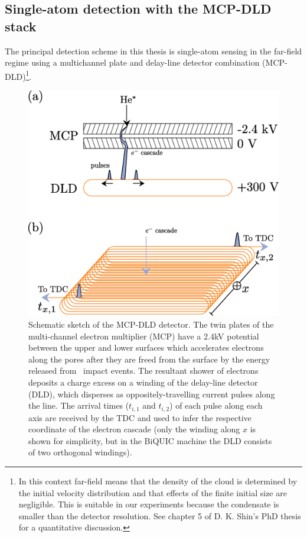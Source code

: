 \subsection*{Single-atom detection with the MCP-DLD stack}
	\label{sec:DLD}
	The principal detection scheme in this thesis is single-atom sensing in the far-field regime using a multichannel plate and delay-line detector combination (MCP-DLD)\footnote{In this context far-field means that the density of the cloud is determined by the initial velocity distribution and that effects of the finite initial size are negligible. This is suitable in our experiments because the condensate is smaller than the detector resolution. See chapter 5 of D. K. Shin's PhD thesis \cite{ShinThesis} for a quantitative discussion.}.
	

	\begin{figure}
		\centering
		\includegraphics[width=\textwidth]{fig/apparatus/mcp_dld_schematic}
		\caption{Schematic sketch of the MCP-DLD detector. The twin plates of the multi-channel electron multiplier (MCP) have a 2.4kV potential between the upper and lower surfaces which accelerates electrons along the pores after they are freed from the surface by the energy released from \mhe~impact events. The resultant shower of electrons deposits a charge excess on a winding of the delay-line detector (DLD), which disperses as oppositely-travelling current pulses along the line. The arrival times ($t_{i,1}$ and $t_{i,2}$) of each pulse along each axis are received by the TDC and used to infer the respective coordinate of the electron cascade (only the winding along $x$ is shown for simplicity, but in the BiQUIC machine the DLD consists of two orthogonal windings).}
		\label{fig:MCP_DLD}
	\end{figure}

